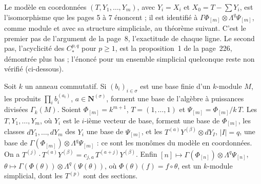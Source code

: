 {\small Le modèle en coordonnées $(T, Y_1, \ldots, Y_m)$, avec $Y_i = X_i$ et $X_0 = T - \sum Y_i$, est l'isomorphisme que les pages 5 à 7 énoncent ; il est identifié à $\Gamma\Phi_{[m]} \otimes \Lambda^q\Psi_{[m]}$, comme module et avec sa structure simpliciale, au théorème suivant. C'est le premier pas de l'argument de la page~8, l'exactitude de chaque ligne. Le second pas, l'acyclicité des $C^{p,q}_*$ pour $p \geq 1$, est la proposition~1 de la page~226, démontrée plus bas ; l'énoncé pour un ensemble simplicial quelconque reste non vérifié (ci-dessous).\par}

\begin{encadre}
\begin{theoreme*}
Soit $k$ un anneau commutatif. Si $(b_i)_{i \in \sigma}$ est une base finie d'un $k$-module $M$, les produits $\prod_i b_i^{(a_i)}$, $a \in \mathbf N^{(\sigma)}$, forment une base de l'algèbre à puissances divisées $\Gamma_k(M)$. Soient $\Phi_{[m]} = k^{m+1}$, $T = (1, \ldots, 1)$ et $\Psi_{[m]} = \Phi_{[m]}/k\,T$. Les $T, Y_1, \ldots, Y_m$, où $Y_i$ est le $i$-ième vecteur de base, forment une base de $\Phi_{[m]}$, les classes $dY_1, \ldots, dY_m$ des $Y_i$ une base de $\Psi_{[m]}$, et les $T^{(a)} Y^{(\beta)} \otimes dY_I$, $|I| = q$, une base de $\Gamma(\Phi_{[m]}) \otimes \Lambda^q \Psi_{[m]}$ : ce sont les monômes du modèle en coordonnées. On a $T^{(j)} \cdot T^{(a)} Y^{(\beta)} = c_{j,a}\, T^{(a+j)} Y^{(\beta)}$. Enfin $[n] \mapsto \Gamma(\Phi_{[n]}) \otimes \Lambda^q \Psi_{[n]}$, $\theta \mapsto \Gamma(\Phi(\theta)) \otimes \Lambda^q(\Psi(\theta))$, où $\Phi(\theta)(f) = f \circ \theta$, est un $k$-module simplicial, dont les $T^{(p)}$ sont des sections.
\end{theoreme*}
\end{encadre}
